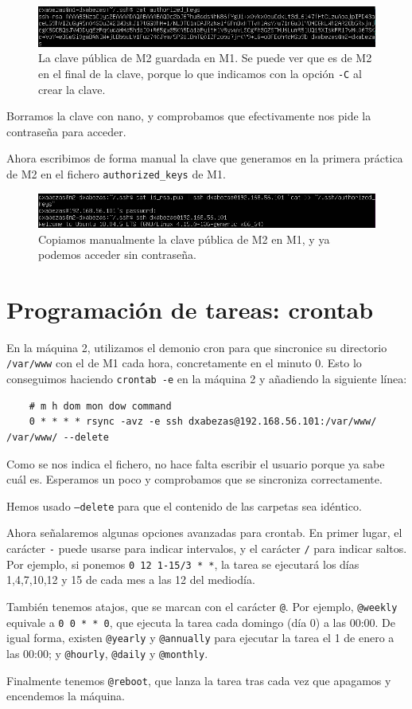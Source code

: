 \documentclass{article}
\begin{document}
\begin{figure}[H]
	\centering
	\includegraphics[width=140mm]{imgs/authorized-keys}
	\caption{La clave pública de M2 guardada en M1. Se puede ver que es de M2 en el final de la clave, porque lo que indicamos con la opción
		 \texttt{-C} al crear la clave.}
	\label{fig:authorized-keys}
\end{figure}

Borramos la clave con nano, y comprobamos que efectivamente nos pide la contraseña para acceder.

Ahora escribimos de forma manual la clave que generamos en la primera práctica de M2 en el fichero \texttt{authorized\_keys} de M1.

\begin{figure}[H]
	\centering
	\includegraphics[width=140mm]{imgs/ssh-manual}
	\caption{Copiamos manualmente la clave pública de M2 en M1, y ya podemos acceder sin contraseña.}
	\label{fig:ssh-manual}
\end{figure}

\section{Programación de tareas: crontab}

En la máquina 2, utilizamos el demonio cron para que sincronice su directorio \texttt{/var/www} con el de M1 cada hora,
concretamente en el minuto 0. Esto lo conseguimos haciendo \texttt{crontab -e} en la máquina 2 y añadiendo la siguiente línea:
\begin{verbatim}
	# m h dom mon dow command
	0 * * * * rsync -avz -e ssh dxabezas@192.168.56.101:/var/www/ /var/www/ --delete
\end{verbatim}
Como se nos indica el fichero, no hace falta escribir el usuario porque ya sabe cuál es. Esperamos un poco y comprobamos que se sincroniza
 correctamente.

Hemos usado \texttt{--delete} para que el contenido de las carpetas sea idéntico.

Ahora señalaremos algunas opciones avanzadas para crontab. En primer lugar, el carácter \texttt{-} puede usarse para indicar intervalos, y
el carácter \texttt{/} para indicar saltos. Por ejemplo, si ponemos \texttt{0 12 1-15/3 * *}, la tarea se ejecutará los días 1,4,7,10,12 y 15
de cada mes a las 12 del mediodía.

También tenemos atajos, que se marcan con el carácter \texttt{@}. Por ejemplo, \texttt{@weekly} equivale a \texttt{0 0 * * 0}, que ejecuta
la tarea cada domingo (día 0) a las 00:00. De igual forma, existen \texttt{@yearly} y \texttt{@annually} para ejecutar la tarea el 1 de
enero a las 00:00; y \texttt{@hourly}, \texttt{@daily} y \texttt{@monthly}.

Finalmente tenemos \texttt{@reboot}, que lanza la tarea tras cada vez que apagamos y encendemos la máquina.
\end{document}
